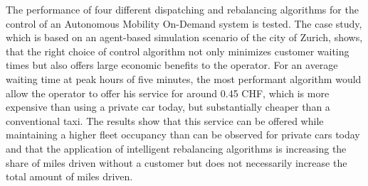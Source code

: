 The performance of four different dispatching and rebalancing algorithms for the control of an Autonomous Mobility On-Demand system is tested. The case study, which is based on an agent-based simulation scenario of the city of Zurich, shows, that the right choice of control algorithm not only minimizes customer waiting times but also offers large economic benefits to the operator. For an average waiting time at peak hours of five minutes, the most performant algorithm would allow the operator to offer his service for around 0.45 CHF, which is more expensive than using a private car today, but substantially cheaper than a conventional taxi. The results show that this service can be offered while maintaining a higher fleet occupancy than can be observed for private cars today and that the application of intelligent rebalancing algorithms is increasing
the share of miles driven without a customer but does not necessarily increase the total amount of miles driven.